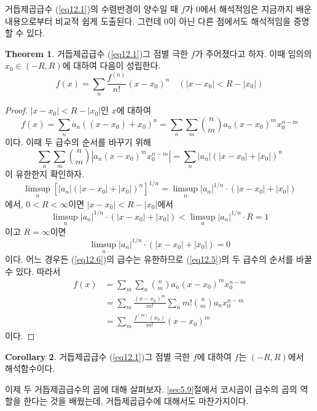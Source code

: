\documentclass[11pt]{book}
\numberwithin{equation}{chapter}
\newcommand{\abs}[1]{\left\vert#1\right\vert}
\theoremstyle{definition}
\newtheorem{thm}{Theorem}[section]
\newtheorem{cor}[thm]{Corollary}
\begin{document}
거듭제곱급수 (\ref{eq12.1})의 수렴반경이 양수일 때 \(f\)가 0에서 해석적임은 지금까지 배운 내용으로부터 비교적 쉽게 도출된다. 그런데 0이 아닌 다른 점에서도 해석적임을 증명할 수 있다.

\begin{thm}
    거듭제곱급수 (\ref{eq12.1})\과 그 점별 극한 \(f\)가 주어졌다고 하자. 이때 임의의 \(x_0 \in (-R, R)\)에 대하여 다음이 성립한다.
    \[
    f(x) = \sum_n \frac{f^{(n)}}{n!} (x - x_0)^n \quad (\abs{x - x_0} < R - \abs{x_0})    
    \]
\end{thm}
\begin{proof}
    \(\abs{x - x_0} < R - \abs{x_0}\)인 \(x\)에 대하여
    \begin{equation} \label{eq12.5}
        f(x) = \sum_n a_n ((x - x_0) + x_0)^n = \sum_n \sum_m \binom{n}{m} a_n (x-x_0)^m x_0^{n-m}
    \end{equation}
    이다. 이때 두 급수의 순서를 바꾸기 위해
    \begin{equation} \label{eq12.6}
        \sum_n \sum_m \binom{n}{m} \abs{a_n (x-x_0)^m x_0^{n-m}} = \sum_n \abs{a_n} (\abs{x - x_0} + \abs{x_0})^n   
    \end{equation}
    이 유한한지 확인하자.
    \[
    \limsup_n [\abs{a_n} (\abs{x - x_0} + \abs{x_0})^n ]^{1/n} = \limsup_n \abs{a_n}^{1/n} \cdot (\abs{x - x_0} + \abs{x_0})    
    \]
    에서, \(0 < R < \infty\)이면 \(\abs{x - x_0} < R - \abs{x_0}\)에서
    \[
        \limsup_n \abs{a_n}^{1/n} \cdot (\abs{x - x_0} + \abs{x_0}) < \limsup_n \abs{a_n}^{1/n} \cdot R = 1
    \]
    이고 \(R = \infty\)이면
    \[
        \limsup_n \abs{a_n}^{1/n} \cdot (\abs{x - x_0} + \abs{x_0}) = 0
    \]
    이다. 어느 경우든 (\ref{eq12.6})의 급수는 유한하므로 (\ref{eq12.5})의 두 급수의 순서를 바꿀 수 있다. 따라서
    \begin{align*}
        f(x) &= \sum_m \sum_n \binom{n}{m} a_n (x-x_0)^m x_0^{n-m}\\
        &= \sum_m \frac{(x - x_0)^m}{m!} \sum_n m! \binom{n}{m} a_n x_0^{n-m}\\
        &= \sum_m \frac{f^{(m)}(x_0)}{m!}(x-x_0)^m
    \end{align*}
    이다.
\end{proof}

\begin{cor}
    거듭제곱급수 (\ref{eq12.1})\과 그 점별 극한 \(f\)에 대하여 \(f\)는 \((-R, R)\)에서 해석함수이다.
\end{cor}

이제 두 거듭제곱급수의 곱에 대해 살펴보자. \ref{sec5.9}절에서 코시곱이 급수의 곱의 역할을 한다는 것을 배웠는데, 거듭제곱급수에 대해서도 마찬가지이다.
\end{document}
